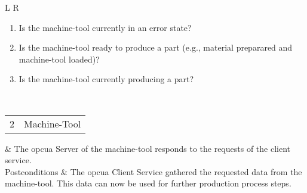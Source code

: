 \documentclass[
a4paper,
twoside,
headsepline,
cleardoublepage=empty,
parskip=half,
draft=false
]{scrbook}
\begin{document}
\begin{table}[hbtp]
\begin{tabular}{L R}
\begin{enumerate}
							\item Is the machine-tool currently in an error state?
							\item Is the machine-tool ready to produce a part (e.g., material preparared and machine-tool loaded)?
							\item Is the machine-tool currently producing a part?
						\end{enumerate}
						\\ \midrule
						\begin{tabular}{c c} 2 & Machine-Tool \end{tabular} & The \gls{opcua} Server of the machine-tool responds to the requests of the client service.
						\\ \midrule
						Postconditions & The \gls{opcua} Client Service gathered the requested data from the machine-tool. This data can now be used for further production process steps.
						\\ \bottomrule
					\end{tabular}
				\end{table}
\end{document}
